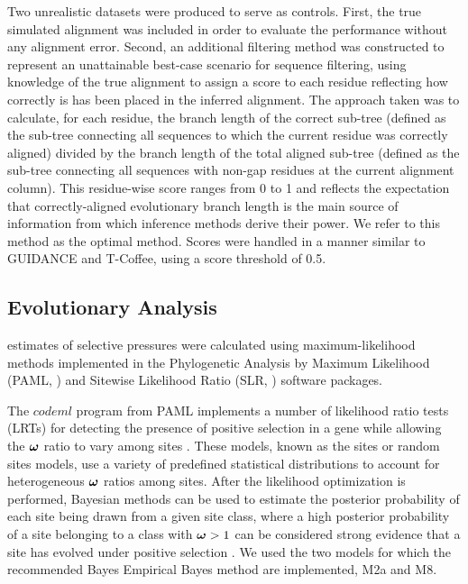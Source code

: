 \documentclass{mbe}
\begin{document}
Two unrealistic datasets were produced to serve as controls. First,
the true simulated alignment was included in order to evaluate the \sw
performance without any alignment error. Second, an additional
filtering method was constructed to represent an unattainable
best-case scenario for sequence filtering, using knowledge of the true
alignment to assign a score to each residue reflecting how correctly
is has been placed in the inferred alignment. The approach taken was
to calculate, for each residue, the branch length of the correct
sub-tree (defined as the sub-tree connecting all sequences to which
the current residue was correctly aligned) divided by the branch
length of the total aligned sub-tree (defined as the sub-tree
connecting all sequences with non-gap residues at the current
alignment column). This residue-wise score ranges from 0 to 1 and
reflects the expectation that correctly-aligned evolutionary branch
length is the main source of information from which \sw inference
methods derive their power. We refer to this method as the optimal
method. Scores were handled in a manner similar to GUIDANCE and
T-Coffee, using a score threshold of 0.5.

\subsection*{\Sw Evolutionary Analysis}

\Sw estimates of selective pressures were calculated using
maximum-likelihood methods implemented in the Phylogenetic Analysis by
Maximum Likelihood (PAML, \citealt{Yang2007PAML}) and Sitewise Likelihood Ratio
(SLR, \citealt{Massingham2005Detecting}) software packages.

The $codeml$ program from PAML implements a number of likelihood ratio
tests (LRTs) for detecting the presence of positive selection in a
gene while allowing the $\bm{\omega}$ ratio to vary among sites
\citep{Yang2000CodonSubstitution}. These models, known as the sites or
random sites models, use a variety of predefined statistical
distributions to account for heterogeneous $\bm{\omega}$ ratios among sites. After
the likelihood optimization is performed, Bayesian methods can be used
to estimate the posterior probability of each site being drawn from a
given site class, where a high posterior probability of a site
belonging to a class with $\bm{\omega}>1$ can be considered strong
evidence that a site has evolved under positive selection
\citep{Yang2005Bayes}. We used the two models for which the
recommended Bayes Empirical Bayes method are implemented, M2a and M8.
\end{document}
